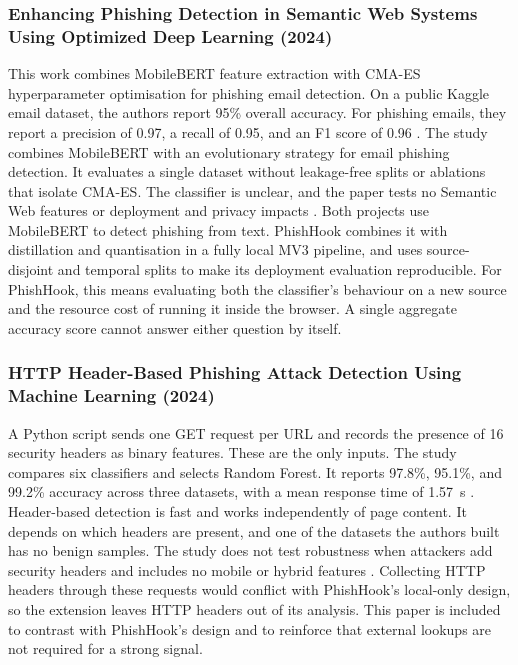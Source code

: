 \documentclass{FastFyp}
\begin{document}
\subsubsection{Enhancing Phishing Detection in Semantic Web Systems Using Optimized Deep Learning (2024)}
This work combines MobileBERT feature extraction with CMA-ES hyperparameter optimisation for phishing email detection. On a public Kaggle email dataset, the authors report 95\% overall accuracy. For phishing emails, they report a precision of 0.97, a recall of 0.95, and an F1 score of 0.96 \cite{semanticweb2024}. The study combines MobileBERT with an evolutionary strategy for email phishing detection. It evaluates a single dataset without leakage-free splits or ablations that isolate CMA-ES. The classifier is unclear, and the paper tests no Semantic Web features or deployment and privacy impacts \cite{semanticweb2024}. Both projects use MobileBERT to detect phishing from text. PhishHook combines it with distillation and quantisation in a fully local MV3 pipeline, and uses source-disjoint and temporal splits to make its deployment evaluation reproducible. For PhishHook, this means evaluating both the classifier's behaviour on a new source and the resource cost of running it inside the browser. A single aggregate accuracy score cannot answer either question by itself.

\subsubsection{HTTP Header-Based Phishing Attack Detection Using Machine Learning (2024)}
A Python script sends one GET request per URL and records the presence of 16 security headers as binary features. These are the only inputs. The study compares six classifiers and selects Random Forest. It reports 97.8\%, 95.1\%, and 99.2\% accuracy across three datasets, with a mean response time of 1.57~s \cite{httpheader2024}. Header-based detection is fast and works independently of page content. It depends on which headers are present, and one of the datasets the authors built has no benign samples. The study does not test robustness when attackers add security headers and includes no mobile or hybrid features \cite{httpheader2024}. Collecting HTTP headers through these requests would conflict with PhishHook's local-only design, so the extension leaves HTTP headers out of its analysis. This paper is included to contrast with PhishHook's design and to reinforce that external lookups are not required for a strong signal.
\end{document}
